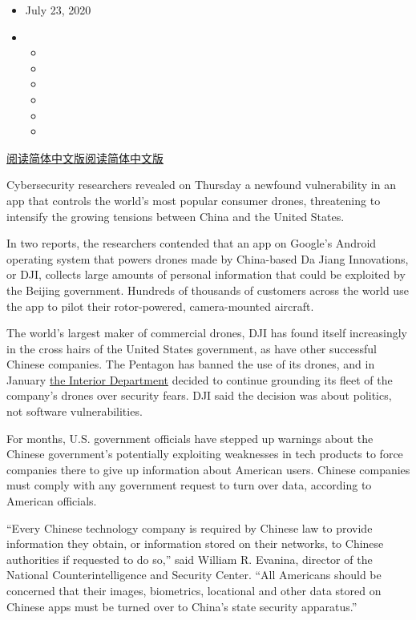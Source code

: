 \begin{itemize}
\item
  July 23, 2020
\item
  \begin{itemize}
  \item
  \item
  \item
  \item
  \item
  \item
  \end{itemize}
\end{itemize}

\href{https://cn.nytimes3xbfgragh.onion/usa/20200724/dji-drones-security-vulnerability/}{阅读简体中文版}\href{https://cn.nytimes3xbfgragh.onion/usa/20200724/dji-drones-security-vulnerability/}{阅读简体中文版}

Cybersecurity researchers revealed on Thursday a newfound vulnerability
in an app that controls the world's most popular consumer drones,
threatening to intensify the growing tensions between China and the
United States.

In two reports, the researchers contended that an app on Google's
Android operating system that powers drones made by China-based Da Jiang
Innovations, or DJI, collects large amounts of personal information that
could be exploited by the Beijing government. Hundreds of thousands of
customers across the world use the app to pilot their rotor-powered,
camera-mounted aircraft.

The world's largest maker of commercial drones, DJI has found itself
increasingly in the cross hairs of the United States government, as have
other successful Chinese companies. The Pentagon has banned the use of
its drones, and in January
\href{https://www.nytimes3xbfgragh.onion/2020/01/29/technology/interior-chinese-drones.html}{the
Interior Department} decided to continue grounding its fleet of the
company's drones over security fears. DJI said the decision was about
politics, not software vulnerabilities.

For months, U.S. government officials have stepped up warnings about the
Chinese government's potentially exploiting weaknesses in tech products
to force companies there to give up information about American users.
Chinese companies must comply with any government request to turn over
data, according to American officials.

``Every Chinese technology company is required by Chinese law to provide
information they obtain, or information stored on their networks, to
Chinese authorities if requested to do so,'' said William R. Evanina,
director of the National Counterintelligence and Security Center. ``All
Americans should be concerned that their images, biometrics, locational
and other data stored on Chinese apps must be turned over to China's
state security apparatus.''

